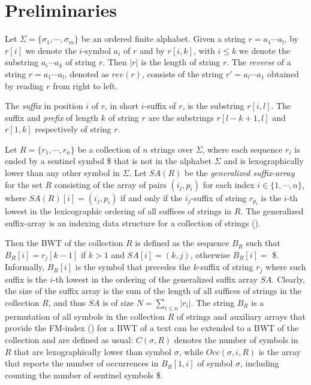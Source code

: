 \documentclass[runningheads,envcountsame,a4paper]{llncs}
\begin{document}
\section{Preliminaries}
Let $\Sigma = \{\sigma_1, \cdots, \sigma_m\}$ be an ordered  finite alphabet.
Given a string $r = a_1 \cdots a_l$, by $r[i]$ we denote the $i$-symbol $a_i$  of $r$ and by $r[i,k]$, with $i \leq k$  we denote  the substring $a_i \cdots a_k$ of string $r$.
Then $|r|$ is the length of string $r$. The {\em reverse} of a string $r = a_1 \cdots a_l$, denoted as $rev(r)$,  consists of the string $r' = a_l \cdots a_1$ obtained by reading $r$ from right to left.

The  {\em suffix} in position $i$ of $r$, in short  $i$-suffix of $r$,  is the substring $r[i, l]$. The   suffix and {\em prefix} of length $k$ of string $r$ are the substrings
$r[l-k +1, l]$ and $r[1, k]$ respectively of string $r$.

Let $R = \{r_1, \cdots, r_n\}$ be a collection of $n$ strings over $\Sigma$, where each sequence $r_i$ is ended by  a sentinel  symbol \$ that is not in the alphabet $\Sigma$ and is lexographically lower than any other symbol in $\Sigma$.
Let $SA(R)$ be the {\em generalized suffix-array} for the set $R$ consisting of  the array of  pairs $(i_j, p_i)$ for each index $i \in \{1, \cdots, n \}$, where
$SA(R)[i]=  (i_j, p_i)$ if and only if  the $i_j$-suffix of string $r_{p_i}$ is the $i$-th lowest in the lexicographic ordering of all suffices of strings in $R$. The generalized suffix-array is an indexing data structure for a collection of strings (\cite{...}).

Then the BWT of the collection $R$ is defined as the sequence $B_R$ such that $B_R[i]=r_{j}[k -1]$ if  $k > 1$ and   $SA[i] = (k,j)$, otherwise $B_R[i]= $ \$.
Informally, $B_R[i]$ is the symbol that precedes the  $k$-suffix  of  string $r_j$ where such suffix is the $i$-th lowest in  the ordering  of the generalized suffix array $SA$.
Clearly, the size of the suffix array is the sum of the length of all suffices of  strings in the collection $R$, and thus $SA$ is of size $N = \sum_{i \leq n}|r_i|$.
The string $B_R$ is a permutation of all symbols in the collection $R$ of strings and auxiliary arrays  that provide the FM-index (\cite{}) for a BWT  of a text can be extended to a BWT of the collection and are defined as usual: $C(\sigma, R)$ denotes the number of symbols in $R$ that are lexographically lower than symbol $\sigma$, while $Occ(\sigma, i, R)$ is the array that reports the number of occurrences in $B_R[1, i]$ of symbol $\sigma$, including counting the number of sentinel symbols \$.
\end{document}
